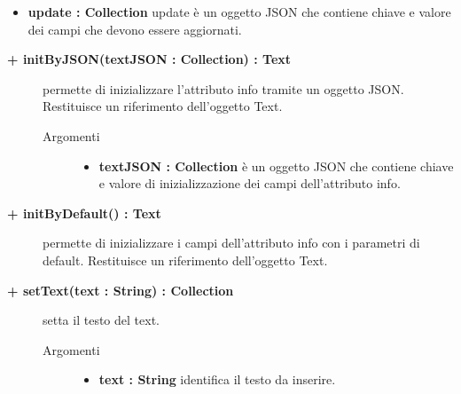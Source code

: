 \begin{description}
\begin{description}
\begin{description}
\begin{itemize}
					\item \textbf{update : Collection			} \hfill
					update è un oggetto JSON che contiene chiave e valore dei campi che devono essere aggiornati. 
				\end{itemize}
		\end{description}

\end{description}

\begin{description}
		\item[\textbf{\color{blue}+ initByJSON(textJSON : Collection) : Text			}] \hfill
			permette di inizializzare l'attributo info tramite un oggetto JSON. Restituisce un riferimento dell'oggetto Text. 
			
		\begin{description}
			\item[Argomenti] \hfill
				\begin{itemize}
				
					\item \textbf{textJSON : Collection			} \hfill
					è un oggetto JSON che contiene chiave e valore di inizializzazione dei campi dell'attributo info. 
				\end{itemize}
		\end{description}

\end{description}

\begin{description}
		\item[\textbf{\color{blue}+ initByDefault() : Text			}] \hfill
			permette di inizializzare i campi dell'attributo info con i parametri di default. Restituisce un riferimento dell'oggetto Text. 

\end{description}

\begin{description}
		\item[\textbf{\color{blue}+ setText(text : String) : Collection			}] \hfill
			setta il testo del text.
			
		\begin{description}
			\item[Argomenti] \hfill
				\begin{itemize}
				
					\item \textbf{text : String			} \hfill
					identifica il testo da inserire.
				\end{itemize}
		\end{description}


\end{description}
\end{description}
